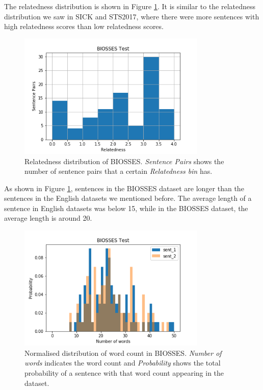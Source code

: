 \begin{enumerate}
The relatedness distribution is shown in Figure \ref{fig:biosses_relatedness}. It is similar to the relatedness distribution we saw in SICK and STS2017, where there were more sentences with high relatedness scores than low relatedness scores.

\begin{figure}
	\centering
	\includegraphics[width=0.8\textwidth]{figures/semantic_textual_similarity/introduction/biosses.png}
	\caption[Relatedness distribution of BIOSSES]{Relatedness distribution of BIOSSES. \textit{Sentence Pairs} shows the number of sentence pairs that a certain \textit{Relatedness bin} has.}
	\label{fig:biosses_relatedness}
\end{figure}

As shown in Figure \ref{fig:biosses_relatedness}, sentences in the BIOSSES dataset are longer than the sentences in the English datasets we mentioned before. The average length of a sentence in English datasets was below 15, while in the BIOSSES dataset, the average length is around 20. 

\begin{figure}
	\centering
	\includegraphics[width=0.8\textwidth]{figures/semantic_textual_similarity/introduction/biosses_words.png}
	\caption[Normalised distribution of word count in BIOSSES.]{Normalised distribution of word count in BIOSSES. \textit{Number of words} indicates the word count and \textit{Probability} shows the total probability of a sentence with that word count appearing in the dataset.}
	\label{fig:biosses_words}
\end{figure}


\end{enumerate}
